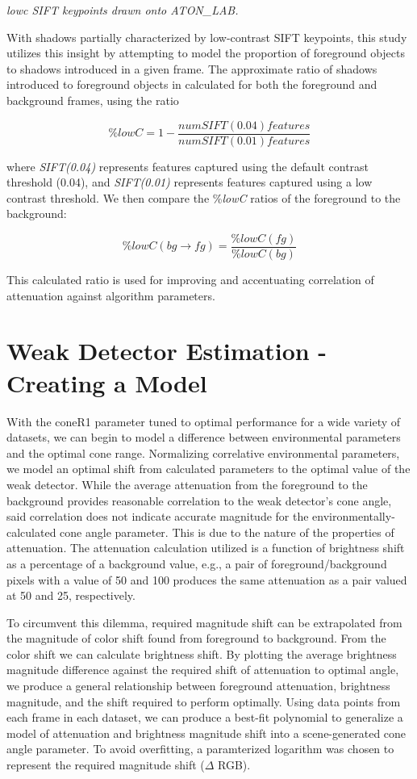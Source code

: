 \documentclass[12pt]{report}
\begin{document}
\textit{lowc SIFT keypoints drawn onto ATON\_LAB.}

With shadows partially characterized by low-contrast SIFT keypoints, this study utilizes this insight by attempting to model the proportion of foreground objects to shadows introduced in a given frame. The approximate ratio of shadows introduced to foreground objects in calculated for both the foreground and background frames, using the ratio

\begin{equation}
\%lowC = 1 - \dfrac{num SIFT(0.04) features}{num SIFT(0.01) features}
\end{equation}

where \textit{SIFT(0.04)} represents features captured using the default contrast threshold (0.04), and \textit{SIFT(0.01)} represents features captured using a low contrast threshold. We then compare the \%\textit{lowC} ratios of the foreground to the background:

\begin{equation}
\%lowC(bg \rightarrow fg) = \dfrac{\%lowC(fg)}{\%lowC(bg)}
\end{equation}

This calculated ratio is used for improving and accentuating correlation of attenuation against algorithm parameters.

\section{Weak Detector Estimation - Creating a Model}

With the coneR1 parameter tuned to optimal performance for a wide variety of datasets, we can begin to model a difference between environmental parameters and the optimal cone range. Normalizing correlative environmental parameters, we model an optimal shift from calculated parameters to the optimal value of the weak detector. While the average attenuation from the foreground to the background provides reasonable correlation to the weak detector's cone angle, said correlation does not indicate accurate magnitude for the environmentally-calculated cone angle parameter. This is due to the nature of the properties of attenuation. The attenuation calculation utilized is a function of brightness shift as a percentage of a background value, e.g., a pair of foreground/background pixels with a value of 50 and 100 produces the same attenuation as a pair valued at 50 and 25, respectively.

To circumvent this dilemma, required magnitude shift can be extrapolated from the magnitude of color shift found from foreground to background. From the color shift we can calculate brightness shift. By plotting the average brightness magnitude difference against the required shift of attenuation to optimal angle, we produce a general relationship between foreground attenuation, brightness magnitude, and the shift required to perform optimally. Using data points from each frame in each dataset, we can produce a best-fit polynomial to generalize a model of attenuation and brightness magnitude shift into a scene-generated cone angle parameter. To avoid overfitting, a paramterized logarithm was chosen to represent the required magnitude shift ($\Delta$ RGB).
\end{document}
